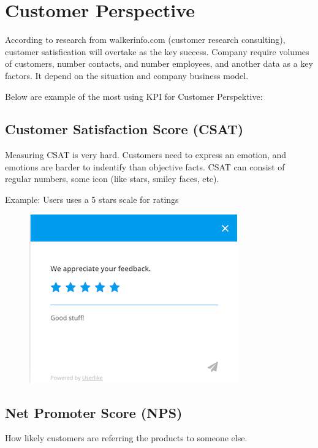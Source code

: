 \documentclass[]{book}
\begin{document}
\section{Customer Perspective}\label{customer-perspective}

According to research from walkerinfo.com (customer research
consulting), customer satisfication will overtake as the key success.
Company require volumes of customers, number contacts, and number
employees, and another data as a key factors. It depend on the situation
and company business model.

Below are example of the most using KPI for Customer Perspektive:

\subsection{Customer Satisfaction Score
(CSAT)}\label{customer-satisfaction-score-csat}

Measuring CSAT is very hard. Customers need to express an emotion, and
emotions are harder to indentify than objective facts. CSAT can consist
of regular numbers, some icon (like stars, smiley faces, etc).

Example: Users uses a 5 stars scale for ratings

\begin{figure}
\centering
\includegraphics{csat.PNG}
\caption{}
\end{figure}

\subsection{Net Promoter Score (NPS)}\label{net-promoter-score-nps}

How likely customers are referring the products to someone else.
\end{document}
